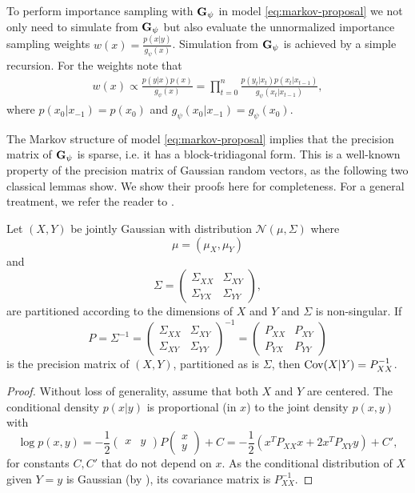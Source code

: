 To perform importance sampling with $\mathbf G_{\psi}$ in model \eqref{eq:markov-proposal} we not only need to simulate from $\mathbf G_{\psi}$ but also evaluate the unnormalized importance sampling weights $w(x) = \frac{p(x|y)}{g_{\psi}(x)}$. Simulation from $\mathbf G_{\psi}$ is achieved by a simple recursion. For the weights note that 
\begin{align}
\label{eq:weights_markov}
w(x) \propto \frac{p(y|x)p(x)}{g_{\psi}(x)} = \prod_{t = 0}^n \frac{p(y_{t}|x_{t})p(x_{t}|x_{t - 1})}{g_{\psi}(x_{t}|x_{t - 1})},
\end{align}
where $p(x_{0}|x_{-1}) = p(x_{0})$ and $g_{\psi}(x_{0}|x_{-1}) = g_{\psi}(x_{0})$.

The Markov structure of model \eqref{eq:markov-proposal} implies that the precision matrix of $\mathbf G_{\psi}$ is sparse, i.e. it has a block-tridiagonal form. This is a well-known property of the precision matrix of Gaussian random vectors, as the following two classical lemmas show. We show their proofs here for completeness. For a general treatment, we refer the reader to \cite[Chapters 3 and 5]{Lauritzen1996Graphical}.

\begin{lemma}
    \label{lem:gaussian_precision}
    Let $(X,Y)$ be jointly Gaussian with distribution $\mathcal N \left( \mu, \Sigma \right)$ where 
    $$
    \mu = \left(\mu_{X}, \mu_{Y}\right)
    $$
    and 
    $$
    \Sigma = \begin{pmatrix}
        \Sigma_{XX} & \Sigma_{XY} \\
        \Sigma_{YX} & \Sigma_{YY}
    \end{pmatrix},
    $$
    are partitioned according to the dimensions of $X$ and $Y$ and $\Sigma$ is non-singular.
    If $$P = \Sigma^{-1} = \begin{pmatrix} \Sigma_{XX} &  \Sigma_{XY} \\ \Sigma_{XY} & \Sigma_{YY} \end{pmatrix}^{-1}=  \begin{pmatrix} P_{XX} & P_{XY} \\ P_{YX} & P_{YY} \end{pmatrix}$$ 
    is the precision matrix of $(X,Y)$, partitioned as is $\Sigma$, then $\operatorname{Cov}(X|Y) = P_{XX}^{-1}$.
\end{lemma}
\begin{proof}
    Without loss of generality, assume that both $X$ and $Y$ are centered. 
    The conditional density $p(x|y)$ is proportional (in $x$) to the joint density $p(x,y)$ with 
    $$\log p(x,y) = -\frac 1 2 \begin{pmatrix} x & y\end{pmatrix}  P \begin{pmatrix} x\\y\end{pmatrix} + C = -\frac 12 \left(x^TP_{XX}x + 2x^TP_{XY}y\right) + C',$$
    for constants $C, C'$ that do not depend on $x$. 
    As the conditional distribution of $X$ given $Y=y$ is Gaussian (by ), its covariance matrix is $P_{XX}^{-1}$.
\end{proof}

